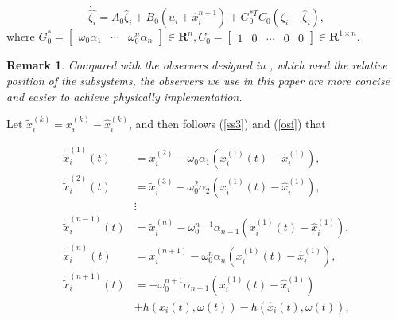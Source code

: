 \documentclass[english]{cccconf}
\newtheorem{remark}{Remark}
\begin{document}
\begin{equation}
  \label{osi}
  \dot {\hat {\zeta_i}} = A_0 \hat \zeta_i + B_0 (u_i + \hat x_i^{n+1}) + G_0^{*T} C_0 (\zeta_i - \hat \zeta_i),
\end{equation} 
where $G_{0}^{*}=\begin{bmatrix} \omega_0 \alpha_1  & \cdots & \omega_0^{n} \alpha_n\end{bmatrix} \in \mathbf R^{n}, C_{0}=\begin{bmatrix} 1 & 0 & \cdots & 0 & 0\end{bmatrix} \in \mathbf R^{1 \times n}$.

\begin{remark}
Compared with the observers designed in \cite{DongCCC2017}, which need the relative position of the subsystems, the observers we use in this paper are more concise and easier to achieve physically implementation.
\end{remark}


Let $\tilde x_i^{(k)} = x_i^{(k)} - \hat x_i^{(k)}$, and then follows (\ref{ss3}) and (\ref{osi}) that  



\begin{equation}
  \label{cei0}
  \begin{aligned}
  {{\dot {\tilde {x}}}}_i^{(1)} (t) &= {{\tilde {x}}}_i^{(2)} - \omega_0 \alpha_1 (x_i^{(1)}(t) - {{\hat {x}}}_i^{(1)}),\\
  {{\dot {\tilde {x}}}}_i^{(2)} (t) &= {{\tilde {x}}}_i^{(3)} - \omega_0^{2} \alpha_2 (x_i^{(1)}(t) - {{\hat {x}}}_i^{(1)}),\\
  & \vdots \\
  {{\dot {\tilde {x}}}}_i^{(n-1)} (t) &= {{\tilde {x}}}_i^{(n)} - \omega_0^{n-1} \alpha_{n-1} (x_i^{(1)}(t) - {{\hat {x}}}_i^{(1)}),\\
  {{\dot {\tilde {x}}}}_i^{(n)} (t) &= {{\tilde {x}}}_i^{(n+1)} - \omega_0^{n} \alpha_n (x_i^{(1)}(t) - {{\hat {x}}}_i^{(1)}),\\
  {{{\dot {\tilde {x}}}}_i^{(n+1)}}(t) &=-\omega_0^{n+1} \alpha_{n+1} (x_i^{(1)}(t) - {{\hat {x}}}_i^{(1)}) \\&+ h( x_i(t),\omega(t)) - h(\hat x_i(t),\omega(t)),\\
  \end{aligned}
\end{equation}

\end{document}
